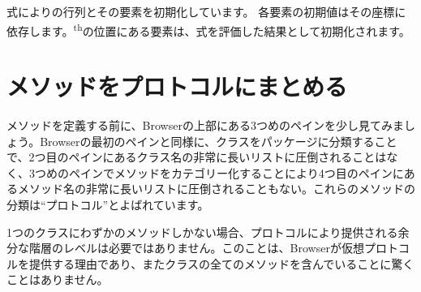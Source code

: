 \documentclass[a4paper,10pt,twoside]{book}
\begin{document}
式によりの行列とその要素を初期化しています。 各要素の初期値はその座標に依存します。\textsuperscript{th}の位置にある要素は、式を評価した結果として初期化されます。





\section{メソッドをプロトコルにまとめる}

メソッドを定義する前に、Browserの上部にある3つめのペインを少し見てみましょう。Browserの最初のペインと同様に、クラスをパッケージに分類することで、2つ目のペインにあるクラス名の非常に長いリストに圧倒されることはなく、3つめのペインでメソッドをカテゴリー化することにより4つ目のペインにあるメソッド名の非常に長いリストに圧倒されることもない。これらのメソッドの分類は``プロトコル''とよばれています。

1つのクラスにわずかのメソッドしかない場合、プロトコルにより提供される余分な階層のレベルは必要ではありません。このことは、Browserが仮想プロトコルを提供する理由であり、またクラスの全てのメソッドを含んでいることに驚くことはありません。
\end{document}
